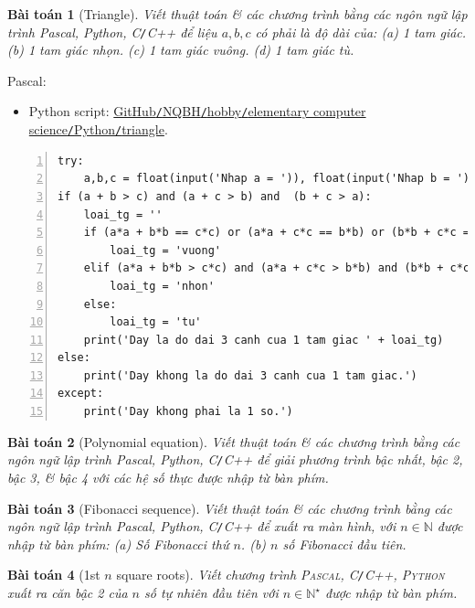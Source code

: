\documentclass{article}
\newtheorem{baitoan}{Bài toán}
\begin{document}
\begin{baitoan}[Triangle]
	Viết thuật toán \& các chương trình bằng các ngôn ngữ lập trình {\sf Pascal, Python, C\texttt{/}C++} để liệu $a,b,c$ có phải là độ dài của: (a) 1 tam giác. (b) 1 tam giác nhọn. (c) 1 tam giác vuông. (d) 1 tam giác tù.
\end{baitoan}
\noindent Pascal: 

\begin{itemize}
	\item Python script: \href{https://github.com/NQBH/hobby/blob/master/elementary_computer_science/Python/triangle.py}{GitHub\texttt{/}NQBH\texttt{/}hobby\texttt{/}elementary computer science\texttt{/}Python\texttt{/}triangle}.
\end{itemize}

\begin{Verbatim}[numbers=left,xleftmargin=5mm]
try:
    a,b,c = float(input('Nhap a = ')), float(input('Nhap b = ')), float(input('Nhap c = '))
if (a + b > c) and (a + c > b) and  (b + c > a):
    loai_tg = ''
    if (a*a + b*b == c*c) or (a*a + c*c == b*b) or (b*b + c*c == a*a):
        loai_tg = 'vuong'
    elif (a*a + b*b > c*c) and (a*a + c*c > b*b) and (b*b + c*c > a*a):
        loai_tg = 'nhon'
    else:
        loai_tg = 'tu'
    print('Day la do dai 3 canh cua 1 tam giac ' + loai_tg)
else: 
    print('Day khong la do dai 3 canh cua 1 tam giac.')			
except:
    print('Day khong phai la 1 so.')
\end{Verbatim}

\begin{baitoan}[Polynomial equation]
	Viết thuật toán \& các chương trình bằng các ngôn ngữ lập trình {\sf Pascal, Python, C\texttt{/}C++} để giải phương trình bậc nhất, bậc 2, bậc 3, \& bậc 4 với các hệ số thực được nhập từ bàn phím.
\end{baitoan}

\begin{baitoan}[Fibonacci sequence]
	Viết thuật toán \& các chương trình bằng các ngôn ngữ lập trình {\sf Pascal, Python, C\texttt{/}C++} để xuất ra màn hình, với $n\in\mathbb{N}$ được nhập từ bàn phím: (a) Số Fibonacci thứ $n$. (b) $n$ số Fibonacci đầu tiên.
\end{baitoan}

\begin{baitoan}[1st $n$ square roots]
	Viết chương trình \textsc{Pascal, C\texttt{/}C++, Python} xuất ra căn bậc 2 của $n$ số tự nhiên đầu tiên với $n\in\mathbb{N}^\star$ được nhập từ bàn phím.
\end{baitoan}
\end{document}
